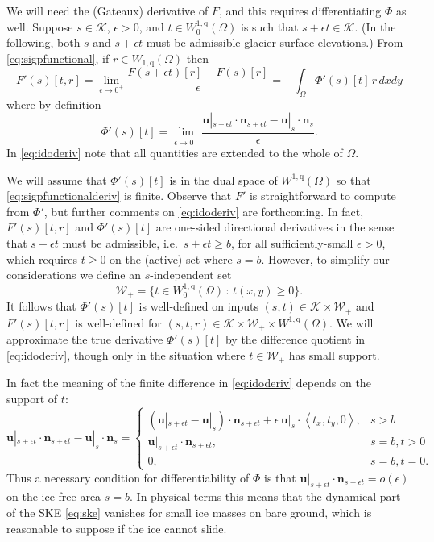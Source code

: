\documentclass[letterpaper,final,12pt,reqno]{amsart}
\theoremstyle{claim}
\newcommand{\eps}{\epsilon}
\newcommand{\bn}{\mathbf{n}}
\newcommand{\bu}{\mathbf{u}}
\newcommand{\qq}{{\text{q}}}
\newcommand{\bus}{\bu|_s}
\numberwithin{equation}{section}
\numberwithin{figure}{section}
\numberwithin{table}{section}
\numberwithin{theorem}{section}
\begin{document}
We will need the (Gateaux) derivative of $F$, and this requires differentiating $\Phi$ as well.  Suppose $s\in \mathcal{K}$, $\eps>0$, and $t \in W_0^{1,\qq}(\Omega)$ is such that $s+\eps t \in \mathcal{K}$.  (In the following, both $s$ and $s+\eps t$ must be admissible glacier surface elevations.)  From \eqref{eq:sigpfunctional}, if $r\in W_{1,\qq}(\Omega)$ then
\begin{equation}
F'(s)[t,r] = \lim_{\eps\to 0^+} \frac{F(s+\eps t)[r] - F(s)[r]}{\eps} = - \int_\Omega \Phi'(s)[t]\, r \,dx dy \label{eq:sigpfunctionalderiv}
\end{equation}
where by definition
\begin{equation}
\Phi'(s)[t] = \lim_{\eps\to 0^+} \frac{\bu|_{s+\eps t} \cdot \bn_{s+\eps t} - \bus \cdot \bn_s}{\eps}. \label{eq:idoderiv}
\end{equation}
In \eqref{eq:idoderiv} note that all quantities are extended to the whole of $\Omega$.

We will assume that $\Phi'(s)[t]$ is in the dual space of $W^{1,\qq}(\Omega)$ so that \eqref{eq:sigpfunctionalderiv} is finite.  Observe that $F'$ is straightforward to compute from $\Phi'$, but further comments on \eqref{eq:idoderiv} are forthcoming.  In fact, $F'(s)[t,r]$ and $\Phi'(s)[t]$ are one-sided directional derivatives in the sense that $s+\eps t$ must be admissible, i.e.~$s+\eps t\ge b$, for all sufficiently-small $\eps>0$, which requires $t\ge 0$ on the (active) set where $s=b$.  However, to simplify our considerations we define an $s$-independent set
\begin{equation}
\mathcal{W}_+ = \{t \in W_0^{1,\qq}(\Omega) \,:\, t(x,y) \ge 0\}. \label{eq:infdefectset}
\end{equation}
It follows that $\Phi'(s)[t]$ is well-defined on inputs $(s,t) \in \mathcal{K} \times \mathcal{W}_+$ and $F'(s)[t,r]$ is well-defined for $(s,t,r) \in \mathcal{K} \times \mathcal{W}_+ \times W^{1,\qq}(\Omega)$.  We will approximate the true derivative $\Phi'(s)[t]$ by the difference quotient in \eqref{eq:idoderiv}, though only in the situation where $t \in \mathcal{W}_+$ has small support.

In fact the meaning of the finite difference in \eqref{eq:idoderiv} depends on the support of $t$:
\begin{equation}
\bu|_{s+\eps t} \cdot \bn_{s+\eps t} - \bus \cdot \bn_s = \begin{cases}
           (\bu|_{s+\eps t} - \bus) \cdot \bn_{s+\eps t} + \eps\, \bus \cdot \left<t_x,t_y,0\right>, & s > b \\
           \bu|_{s+\eps t} \cdot \bn_{s+\eps t}, & s=b, t > 0 \\
           0, & s=b, t = 0.
                 \end{cases} \label{eq:differencecases}
\end{equation}
Thus a necessary condition for differentiability of $\Phi$ is that $\bu|_{s+\eps t} \cdot \bn_{s+\eps t} = o(\eps)$ on the ice-free area $s=b$.  In physical terms this means that the dynamical part of the SKE \eqref{eq:ske} vanishes for small ice masses on bare ground, which is reasonable to suppose if the ice cannot slide.
\end{document}
